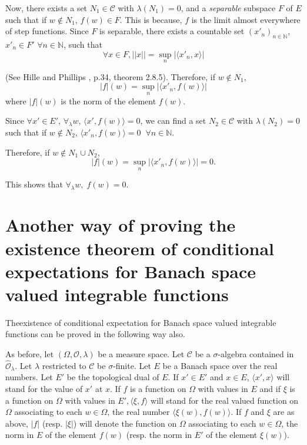 Now, there exists a set $N_1 \in \mathscr{C}$ with $\lambda(N_1) = 0$,
and a \textit{separable} subspace $F$ of $E$ such that if $w \not\in
N_1$, $f(w) \in F$. This is because, $f$ is the limit almost
everywhere of step functions. Since $F$ is separable, there exists a
countable set $(x'_n)_{n \in \mathbb{N}}$, $x'_n \in F'$ $\forall n
\in \mathbb{N}$, such that 
$$
\forall x \in F, ||x|| = \sup\limits_n |\langle x'_n, x\rangle| 
$$

(See Hille and Phillips \cite{key1}, p.34, theorem 2.8.5). Therefore,
if $w \not\in N_1$,
$$
|f| (w) = \sup\limits_n |\langle x'_n, f(w)\rangle|
$$
where $|f|(w)$ is the norm of the element $f(w)$.

Since $\forall x' \in E'$, $\forall_\lambda w$, $\langle x', f(w)
\rangle = 0$, we can find a set $N_2 \in \mathscr{C}$ with
$\lambda(N_2) =0$ such that if $w \not\in N_2$, $\langle x'_n,
f(w)\rangle = 0 \; \; \forall n \in \mathbb{N}$. 

Therefore, if $w \not\in N_1 \cup N_2$, 
$$
|f| (w) = \sup\limits_n |\langle x'_n, f(w)\rangle| = 0. 
$$

This shows that  \quad $ \forall_\lambda w, \; f(w) = 0$. 


\section[Another way of proving the existence...]{Another way of proving 
the existence theorem of conditional
  expectations for Banach space valued integrable
  functions}\label{part1:chap1:sec7} 

The\pageoriginale existence of conditional expectation for Banach
space valued integrable functions can be proved in the following way
also. 

As before, let $(\Omega, \mathscr{O}, \lambda)$ be a measure
space. Let $\mathscr{C}$ be a $\sigma$-algebra contained in
$\hat{\mathscr{O}}_\lambda$. Let $\lambda$ restricted to $\mathscr{C}$
be $\sigma$-finite. Let $E$ be a Banach space over the real
numbers. Let $E'$ be the topological dual of $E$. If $x' \in E'$ and
$x \in E$, $\langle x', x\rangle $ will stand for the value of $x'$ at
$x$. If $f$ is a function on $\Omega$ with values in $E$ and if $\xi$
is a function on $\Omega$ with values in $E', \langle \xi, f\rangle$
will stand for the real valued function on $\Omega$ associating to
each $w \in \Omega$, the real number $\langle \xi (w),
f(w)\rangle$. If $f$ and $\xi$ are as above, $|f|$ (resp. $|\xi|$)
will denote the function on $\Omega$ associating to each $w \in
\Omega$, the norm in $E$ of the element $f(w)$ (resp. the norm in $E'$
of the element $\xi(w)$). 

